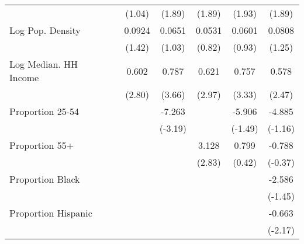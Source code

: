 {\begin{tabular}{l*{6}{c}}
                    &                     &      (1.04)         &      (1.89)         &      (1.89)         &      (1.93)         &      (1.89)         \\
\addlinespace
Log Pop. Density    &                     &      0.0924         &      0.0651         &      0.0531         &      0.0601         &      0.0808         \\
                    &                     &      (1.42)         &      (1.03)         &      (0.82)         &      (0.93)         &      (1.25)         \\
\addlinespace
Log Median. HH Income&                     &       0.602\sym{**} &       0.787\sym{***}&       0.621\sym{**} &       0.757\sym{**} &       0.578\sym{*}  \\
                    &                     &      (2.80)         &      (3.66)         &      (2.97)         &      (3.33)         &      (2.47)         \\
\addlinespace
Proportion 25-54    &                     &                     &      -7.263\sym{**} &                     &      -5.906         &      -4.885         \\
                    &                     &                     &     (-3.19)         &                     &     (-1.49)         &     (-1.16)         \\
\addlinespace
Proportion 55+      &                     &                     &                     &       3.128\sym{**} &       0.799         &      -0.788         \\
                    &                     &                     &                     &      (2.83)         &      (0.42)         &     (-0.37)         \\
\addlinespace
Proportion Black    &                     &                     &                     &                     &                     &      -2.586         \\
                    &                     &                     &                     &                     &                     &     (-1.45)         \\
\addlinespace
Proportion Hispanic &                     &                     &                     &                     &                     &      -0.663\sym{*}  \\
                    &                     &                     &                     &                     &                     &     (-2.17)         \\

\end{tabular}}
